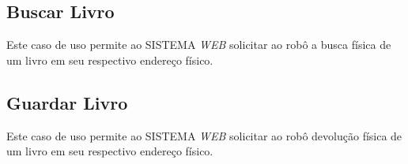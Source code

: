\subsection{Buscar Livro}
Este caso de uso permite ao SISTEMA \textit{WEB} solicitar ao robô a busca física de um livro em seu respectivo endereço físico.

\subsection{Guardar Livro}
Este caso de uso permite ao SISTEMA \textit{WEB} solicitar ao robô devolução física de um livro em seu respectivo endereço físico.

